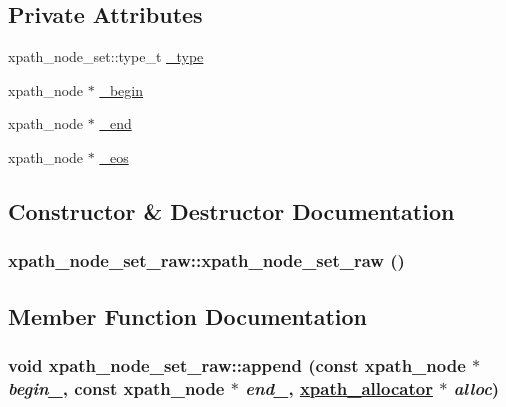 \subsection*{Private Attributes}
\begin{CompactItemize}
\item 
xpath\_\-node\_\-set::type\_\-t \hyperlink{classxpath__node__set__raw_00a164066aff1d6075631b2532ed9713}{\_\-type}
\item 
xpath\_\-node $\ast$ \hyperlink{classxpath__node__set__raw_8e6071473610e8340b07a64767ef68c0}{\_\-begin}
\item 
xpath\_\-node $\ast$ \hyperlink{classxpath__node__set__raw_f8435774146a65edee6cf320dbb8930f}{\_\-end}
\item 
xpath\_\-node $\ast$ \hyperlink{classxpath__node__set__raw_886a925457f162fe38483da1d57b9b56}{\_\-eos}
\end{CompactItemize}


\subsection{Constructor \& Destructor Documentation}
\hypertarget{classxpath__node__set__raw_e849a23893eef70c01197feaf5c07544}{
\subsubsection[xpath\_\-node\_\-set\_\-raw]{\setlength{\rightskip}{0pt plus 5cm}xpath\_\-node\_\-set\_\-raw::xpath\_\-node\_\-set\_\-raw ()}}
\label{classxpath__node__set__raw_e849a23893eef70c01197feaf5c07544}




\subsection{Member Function Documentation}
\hypertarget{classxpath__node__set__raw_0c02728de3d895a2d12df9666d60e414}{
\subsubsection[append]{\setlength{\rightskip}{0pt plus 5cm}void xpath\_\-node\_\-set\_\-raw::append (const xpath\_\-node $\ast$ {\em begin\_\-}, const xpath\_\-node $\ast$ {\em end\_\-}, \hyperlink{classxpath__allocator}{xpath\_\-allocator} $\ast$ {\em alloc})}}
\label{classxpath__node__set__raw_0c02728de3d895a2d12df9666d60e414}


